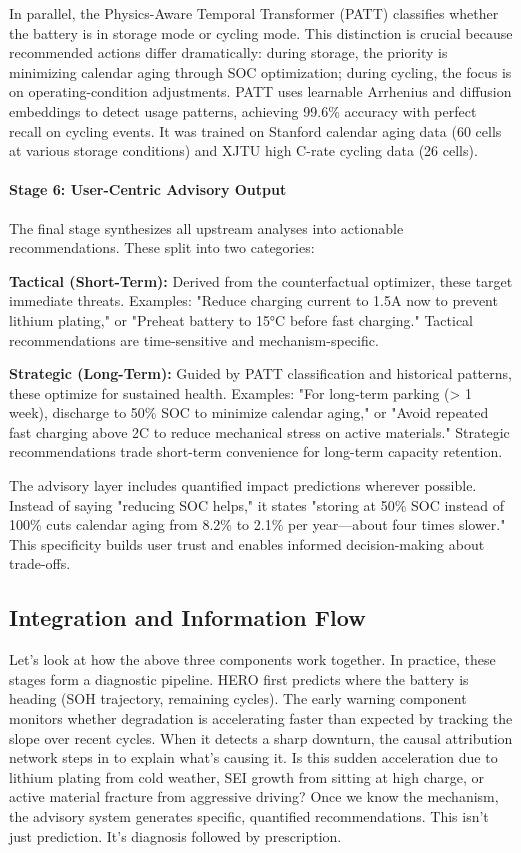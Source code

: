 \documentclass[5p,times,authoryear]{elsarticle}
\begin{document}
In parallel, the Physics-Aware Temporal Transformer (PATT) classifies whether the battery is in storage mode or cycling mode. This distinction is crucial because recommended actions differ dramatically: during storage, the priority is minimizing calendar aging through SOC optimization; during cycling, the focus is on operating-condition adjustments. PATT uses learnable Arrhenius and diffusion embeddings to detect usage patterns, achieving 99.6\% accuracy with perfect recall on cycling events. It was trained on Stanford calendar aging data (60 cells at various storage conditions) and XJTU high C-rate cycling data (26 cells).

\paragraph{Stage 6: User-Centric Advisory Output}

The final stage synthesizes all upstream analyses into actionable recommendations. These split into two categories:

\textbf{Tactical (Short-Term):} Derived from the counterfactual optimizer, these target immediate threats. Examples: "Reduce charging current to 1.5A now to prevent lithium plating," or "Preheat battery to 15°C before fast charging." Tactical recommendations are time-sensitive and mechanism-specific.

\textbf{Strategic (Long-Term):} Guided by PATT classification and historical patterns, these optimize for sustained health. Examples: "For long-term parking (> 1 week), discharge to 50\% SOC to minimize calendar aging," or "Avoid repeated fast charging above 2C to reduce mechanical stress on active materials." Strategic recommendations trade short-term convenience for long-term capacity retention.

The advisory layer includes quantified impact predictions wherever possible. Instead of saying "reducing SOC helps," it states "storing at 50\% SOC instead of 100\% cuts calendar aging from 8.2\% to 2.1\% per year—about four times slower." This specificity builds user trust and enables informed decision-making about trade-offs.

\subsection{Integration and Information Flow}




Let's look at how the above three components work together. In practice, these stages form a diagnostic pipeline. HERO first predicts where the battery is heading (SOH trajectory, remaining cycles). The early warning component monitors whether degradation is accelerating faster than expected by tracking the slope over recent cycles. When it detects a sharp downturn, the causal attribution network steps in to explain what's causing it. Is this sudden acceleration due to lithium plating from cold weather, SEI growth from sitting at high charge, or active material fracture from aggressive driving? Once we know the mechanism, the advisory system generates specific, quantified recommendations. This isn't just prediction. It's diagnosis followed by prescription.
\end{document}
